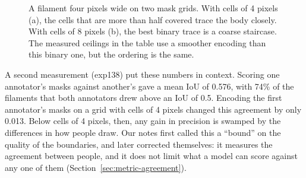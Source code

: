 \begin{figure}[t]
\centering
{}
\caption{A filament four pixels wide on two mask grids. With cells of 4 pixels (a), the cells that are
more than half covered trace the body closely. With cells of 8 pixels (b), the best binary trace is a
coarse staircase. The measured ceilings in the table use a smoother encoding than this binary one, but
the ordering is the same. }
\label{fig:train-grid}
\end{figure}

A second measurement (exp138) put these numbers in context. Scoring one annotator's masks against
another's gave a mean IoU of 0.576, with 74\% of the filaments that both annotators drew above an IoU
of 0.5. Encoding the first annotator's masks on a grid with cells of 4 pixels changed this agreement
by only 0.013. Below cells of 4 pixels, then, any gain in precision is swamped by the differences in
how people draw. Our notes first called this a ``bound'' on the quality of the boundaries, and later
corrected themselves: it measures the agreement between people, and it does not limit what a model
can score against any one of them (Section~\ref{sec:metric-agreement}).

